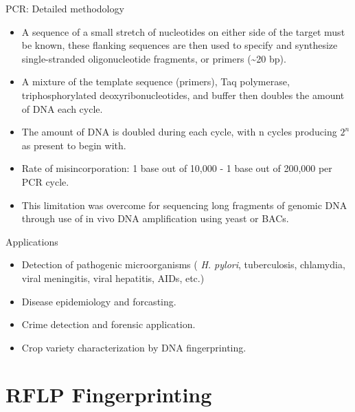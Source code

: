 \documentclass[
  ignorenonframetext,
  aspectratio=169]{beamer}
\providecommand{\tightlist}{%
  \setlength{\itemsep}{0pt}\setlength{\parskip}{0pt}}
\begin{document}
\begin{frame}{PCR: Detailed methodology}
\protect\hypertarget{pcr-detailed-methodology}{}
\begin{itemize}
\tightlist
\item
  A sequence of a small stretch of nucleotides on either side of the
  target must be known, these flanking sequences are then used to
  specify and synthesize single-stranded oligonucleotide fragments, or
  primers (\textasciitilde20 bp).
\item
  A mixture of the template sequence (primers), Taq polymerase,
  triphosphorylated deoxyribonucleotides, and buffer then doubles the
  amount of DNA each cycle.
\item
  The amount of DNA is doubled during each cycle, with n cycles
  producing \(2^n\) as present to begin with.
\item
  Rate of misincorporation: 1 base out of 10,000 - 1 base out of 200,000
  per PCR cycle.
\item
  This limitation was overcome for sequencing long fragments of genomic
  DNA through use of in vivo DNA amplification using yeast or BACs.
\end{itemize}
\end{frame}

\begin{frame}{Applications}
\protect\hypertarget{applications}{}
\begin{itemize}
\tightlist
\item
  Detection of pathogenic microorganisms ( \emph{H. pylori},
  tuberculosis, chlamydia, viral meningitis, viral hepatitis, AIDs,
  etc.)
\item
  Disease epidemiology and forcasting.
\item
  Crime detection and forensic application.
\item
  Crop variety characterization by DNA fingerprinting.
\end{itemize}
\end{frame}

\hypertarget{rflp-fingerprinting}{%
\section{RFLP Fingerprinting}\label{rflp-fingerprinting}}
\end{document}
